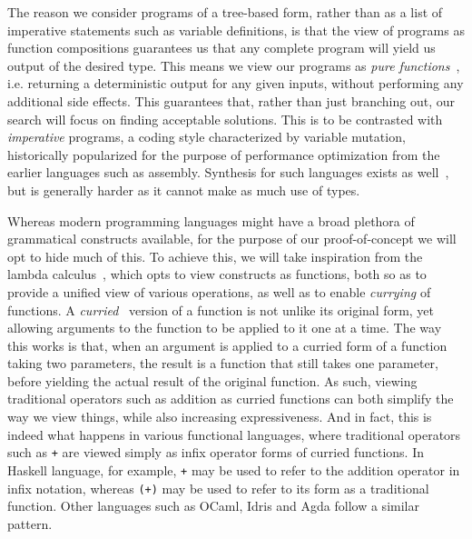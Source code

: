 \documentclass{article}
\begin{document}
The reason we consider programs of a tree-based form, rather than as a list of imperative statements such as variable definitions,
is that the view of programs as function compositions guarantees us that any complete program will yield us output of the desired type.
This means we view our programs as \emph{pure functions}~\citep{fortran95},
i.e. returning a deterministic output for any given inputs, without performing any additional side effects.
This guarantees that, rather than just branching out, our search will focus on finding acceptable solutions.
This is to be contrasted with \emph{imperative} programs, a coding style characterized by variable mutation,
historically popularized for the purpose of performance optimization from the earlier languages such as assembly.
Synthesis for such languages exists as well~\citep{shi2019frangel}, but is generally harder as it cannot make as much use of types.

Whereas modern programming languages might have a broad plethora of grammatical constructs available,
for the purpose of our proof-of-concept we will opt to hide much of this.
To achieve this, we will take inspiration from the lambda calculus~\citep{lambdacalculus},
which opts to view constructs as functions,
both so as to provide a unified view of various operations, as well as to enable \emph{currying} of functions.
A \emph{curried}~\citep{currying} version of a function is not unlike its original form,
yet allowing arguments to the function to be applied to it one at a time.
The way this works is that, when an argument is applied to a curried form of a function taking two parameters,
the result is a function that still takes one parameter, before yielding the actual result of the original function.
As such, viewing traditional operators such as addition as curried functions can both simplify the way we view things,
while also increasing expressiveness.
And in fact, this is indeed what happens in various functional languages,
where traditional operators such as \verb|+| are viewed simply as infix operator forms of curried functions.
In Haskell language, for example, \verb|+| may be used to refer to the addition operator in infix notation,
whereas \verb|(+)| may be used to refer to its form as a traditional function.
Other languages such as OCaml, Idris and Agda follow a similar pattern.
\end{document}
